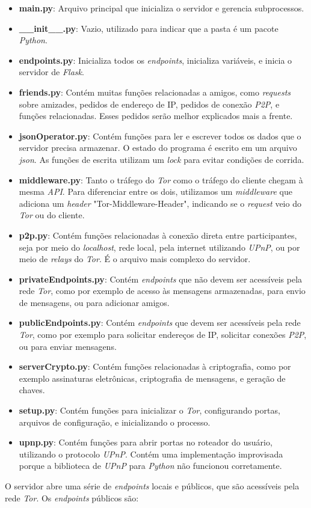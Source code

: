 \begin{itemize}
    \item \textbf{main.py}: Arquivo principal que inicializa o servidor e gerencia subprocessos.
    \item \textbf{\_\_init\_\_.py}: Vazio, utilizado para indicar que a pasta é um pacote \textit{Python}.
    \item \textbf{endpoints.py}: Inicializa todos os \textit{endpoints}, inicializa variáveis, e inicia o servidor de \textit{Flask}.
    \item \textbf{friends.py}: Contém muitas funções relacionadas a amigos, como \textit{requests} sobre amizades, pedidos de endereço de IP, pedidos de conexão \textit{P2P}, e funções relacionadas. Esses pedidos serão melhor explicados mais a frente.
    \item \textbf{jsonOperator.py}: Contém funções para ler e escrever todos os dados que o servidor precisa armazenar. O estado do programa é escrito em um arquivo \textit{json}. As funções de escrita utilizam um \textit{lock} para evitar condições de corrida.
    \item \textbf{middleware.py}: Tanto o tráfego do \textit{Tor} como o tráfego do cliente chegam à mesma \textit{API}. Para diferenciar entre os dois, utilizamos um \textit{middleware} que adiciona um \textit{header} "Tor-Middleware-Header", indicando se o \textit{request} veio do \textit{Tor} ou do cliente.
    \item \textbf{p2p.py}: Contém funções relacionadas à conexão direta entre participantes, seja por meio do \textit{localhost}, rede local, pela internet utilizando \textit{UPnP}, ou por meio de \textit{relays} do \textit{Tor}. É o arquivo mais complexo do servidor.
    \item \textbf{privateEndpoints.py}: Contém \textit{endpoints} que não devem ser acessíveis pela rede \textit{Tor}, como por exemplo de acesso às mensagens armazenadas, para envio de mensagens, ou para adicionar amigos.
    \item \textbf{publicEndpoints.py}: Contém \textit{endpoints} que devem ser acessíveis pela rede \textit{Tor}, como por exemplo para solicitar endereços de IP, solicitar conexões \textit{P2P}, ou para enviar mensagens.
    \item \textbf{serverCrypto.py}: Contém funções relacionadas à criptografia, como por exemplo assinaturas eletrônicas, criptografia de mensagens, e geração de chaves.
    \item \textbf{setup.py}: Contém funções para inicializar o \textit{Tor}, configurando portas, arquivos de configuração, e inicializando o processo.
    \item \textbf{upnp.py}: Contém funções para abrir portas no roteador do usuário, utilizando o protocolo \textit{UPnP}. Contém uma implementação improvisada porque a biblioteca de \textit{UPnP} para \textit{Python} não funcionou corretamente.
\end{itemize}
O servidor abre uma série de \textit{endpoints} locais e públicos, que são acessíveis pela rede \textit{Tor}. Os \textit{endpoints} públicos são:

